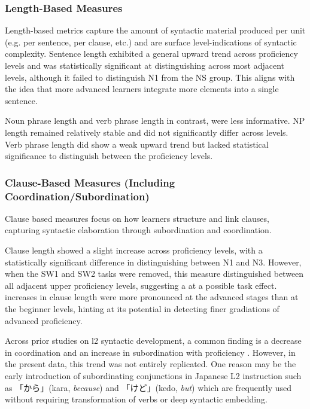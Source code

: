 \subsubsection{Length-Based Measures}

Length-based metrics capture the amount of syntactic material produced per unit (e.g. per sentence, per clause,
etc.) and are surface level-indications of syntactic complexity. Sentence length exhibited a general upward trend
across proficiency levels and was statistically significant at distinguishing across most adjacent levels, although
it failed to distinguish N1 from the NS group. This aligns
with
the idea that more advanced learners integrate more elements into a single sentence.

Noun phrase length and verb phrase length in contrast, were less informative. NP length remained relatively stable
and did not significantly differ across levels. Verb phrase length did show a weak upward trend but lacked
statistical significance to distinguish between the proficiency levels.

\subsubsection{Clause-Based Measures (Including Coordination/Subordination)}
Clause based measures focus on how learners structure and link clauses, capturing syntactic elaboration through
subordination and coordination.

Clause length showed a slight
increase across proficiency levels, with a statistically significant difference in distinguishing between N1 and N3.
However, when the SW1 and SW2
tasks were removed, this measure distinguished between all adjacent upper proficiency levels, suggesting a at a
possible
task effect. increases in clause length were more pronounced at the advanced stages than at the beginner levels,
hinting at its potential in detecting finer gradiations of advanced proficiency.

Across prior studies on l2 syntactic development, a common finding is a decrease in coordination and an increase in
subordination with proficiency \citep{Vyatkina2012, Lu2010,Lu2011}. However, in the present data, this trend was not
entirely replicated. One reason may be the early introduction of subordinating conjunctions in Japanese L2
instruction such as 「から」(kara, \textit{because}) and 「けど」(kedo, \textit{but}) which are frequently used without
requiring transformation of verbs or deep syntactic embedding.


